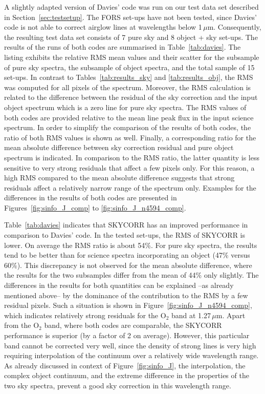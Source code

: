 A slightly adapted version of Davies' code was run on our test data set
described in Section~\ref{sec:testsetup}. The FORS set-ups have not been
tested, since Davies' code is not able to correct airglow lines at wavelengths
below 1\,$\mu$m. Consequently, the resulting test data set consists of 7 pure
sky and 8 object + sky set-ups. The results of the runs of both codes are
summarised in Table~\ref{tab:davies}. The listing exhibits the relative RMS
mean values and their scatter for the subsample of pure sky spectra, the
subsample of object spectra, and the total sample of 15 set-ups. In contrast to
Tables~\ref{tab:results_sky} and \ref{tab:results_obj}, the RMS was computed
for all pixels of the spectrum. Moreover, the RMS calculation is related to the
difference between the residual of the sky correction and the input object
spectrum which is a zero line for pure sky spectra. The RMS values of both
codes are provided relative to the mean line peak flux in the input science
spectrum. In order to simplify the comparison of the results of both codes, the
ratio of both RMS values is shown as well. Finally, a corresponding ratio for
the mean absolute difference between sky correction residual and pure object
spectrum is indicated. In comparison to the RMS ratio, the latter quantity is
less sensitive to very strong residuals that affect a few pixels only. For this
reason, a high RMS compared to the mean absolute difference suggests that
strong residuals affect a relatively narrow range of the spectrum only.
Examples for the differences in the results of both codes are presented in
Figures~\ref{fig:sinfo_J_comp} to \ref{fig:sinfo_J_n4594_comp}.

Table~\ref{tab:davies} indicates that SKYCORR has an improved performance in
comparison to Davies' code. In the tested set-ups, the RMS of SKYCORR is
lower. On average the RMS ratio is about 54\%. For pure sky spectra, the
results tend to be better than for science spectra incorporating an object
(47\% versus 60\%). This discrepancy is not observed for the mean absolute
difference, where the results for the two subsamples differ from the mean of
44\% only slightly. The differences in the results for both quantities can be
explained --as already mentioned above-- by the dominance of the contribution
to the RMS by a few residual pixels. Such a situation is shown in
Figure~\ref{fig:sinfo_J_n4594_comp}, which indicates relatively strong
residuals for the O$_2$ band at 1.27\,$\mu$m. Apart from the O$_2$ band, where
both codes are comparable, the SKYCORR performance is superior (by a factor of
2 on average). However, this particular band cannot be corrected very well,
since the density of strong lines is very high requiring interpolation of the
continuum over a relatively wide wavelength range. As already discussed in
context of Figure~\ref{fig:sinfo_J}, the interpolation, the complex object
continuum, and the extreme difference in the properties of the two sky spectra,
prevent a good sky correction in this wavelength range.

